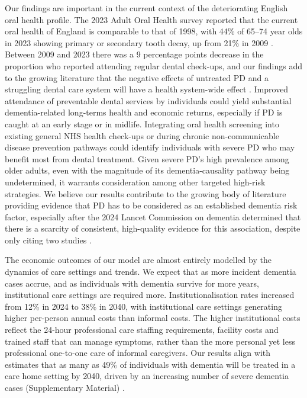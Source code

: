 \documentclass[11pt,a4paper]{article}
\begin{document}
Our findings are important in the current context of the deteriorating English oral health profile. The 2023 Adult Oral Health survey reported that the current oral health of England is comparable to that of 1998, with 44\% of 65--74 year olds in 2023 showing primary or secondary tooth decay, up from 21\% in 2009 \cite{ref43}. Between 2009 and 2023 there was a 9 percentage points decrease in the proportion who reported attending regular dental check-ups, and our findings add to the growing literature that the negative effects of untreated PD and a struggling dental care system will have a health system-wide effect \cite{ref44}. Improved attendance of preventable dental services by individuals could yield substantial dementia-related long-terms health and economic returns, especially if PD is caught at an early stage or in midlife. Integrating oral health screening into existing general NHS health check-ups or during chronic non-communicable disease prevention pathways could identify individuals with severe PD who may benefit most from dental treatment. Given severe PD's high prevalence among older adults, even with the magnitude of its dementia-causality pathway being undetermined, it warrants consideration among other targeted high-risk strategies. We believe our results contribute to the growing body of literature providing evidence that PD has to be considered as an established dementia risk factor, especially after the 2024 Lancet Commission on dementia determined that there is a scarcity of consistent, high-quality evidence for this association, despite only citing two studies \cite{ref18,ref45}.

The economic outcomes of our model are almost entirely modelled by the dynamics of care settings and trends. We expect that as more incident dementia cases accrue, and as individuals with dementia survive for more years, institutional care settings are required more. Institutionalisation rates increased from 12\% in 2024 to 38\% in 2040, with institutional care settings generating higher per-person annual costs than informal costs. The higher institutional costs reflect the 24-hour professional care staffing requirements, facility costs and trained staff that can manage symptoms, rather than the more personal yet less professional one-to-one care of informal caregivers. Our results align with estimates that as many as 49\% of individuals with dementia will be treated in a care home setting by 2040, driven by an increasing number of severe dementia cases (Supplementary Material) \cite{ref17}.
\end{document}

